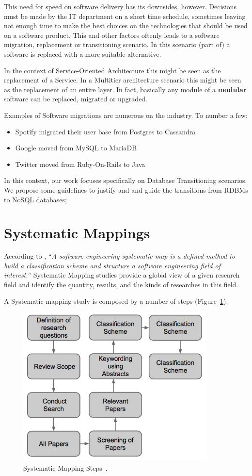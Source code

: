 This need for speed on software delivery has its downsides, however. Decisions must be made by the IT department on a short time schedule, sometimes leaving not enough time to make the best choices on the technologies that should be used on a software product. This and other factors oftenly leads to a software migration, replacement or transitioning scenario. In this scenario (part of) a software is replaced with a more suitable alternative.

In the context of Service-Oriented Architecture this might be seen as the replacement of a Service. In a Multitier architecture scenario this might be seen as the replacement of an entire layer. In fact, basically any module of a \textbf{modular} software can be replaced, migrated or upgraded. 

Examples of Software migrations are numerous on the industry. To number a few: 
\begin{itemize}
\item{Spotify migrated their user base from Postgres to Cassandra\cite{spotifyEngineering}}
\item{Google moved from MySQL to MariaDB\cite{googleMariaDB}}
\item{Twitter moved from Ruby-On-Rails to Java\cite{twitterRails}}
\end{itemize}

In this context, our work focuses specifically on Database Transitioning scenarios. We propose some guidelines to justify and and guide the transitions from RDBMs to NoSQL databases;

\section{Systematic Mappings}
According to \cite{Petersen:2008:SMS:2227115.2227123}, ``\textit{A software engineering systematic map is a defined method to build a classification scheme and structure a software engineering field of interest.}''
Systematic Mapping studies provide a global view of a given research field and identify the quantity, results, and the kinds of researches in this field.

A Systematic mapping study is composed by a number of steps (Figure~\ref{fig:sms}).
\begin{figure}[ht!]
\centering
\includegraphics[width=100mm]{Imagens/pic1.png}
\caption{Systematic Mapping Steps~\cite{Petersen:2008:SMS:2227115.2227123}.\label{fig:sms}}
\end{figure}

